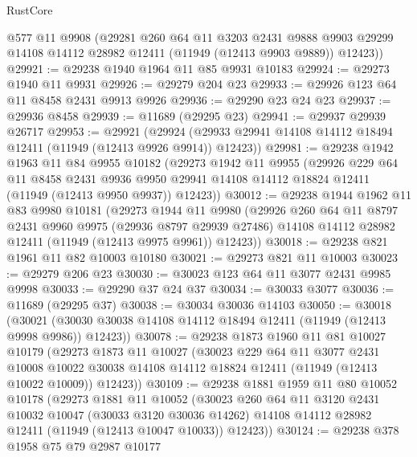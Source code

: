 \begin{lexlean}{RustCore}
\begin{coremodule}
      @577
      @11
      @9908
      (@29281
        @260
        @64
        @11
        @3203
        @2431
        @9888
        @9903
        @29299
        @14108
        @14112
        @28982
        @12411
        (@11949 (@12413 @9903 @9889))
        @12423))
@29921 := @29238 @1940 @1964 @11 @85 @9931 @10183
@29924 := @29273 @1940 @11 @9931
@29926 := @29279 @204 @23
@29933 := @29926 @123 @64 @11 @8458 @2431 @9913 @9926
@29936 := @29290 @23 @24 @23
@29937 := @29936 @8458
@29939 := @11689 (@29295 @23)
@29941 := @29937 @29939 @26717
@29953 := @29921
    (@29924 (@29933 @29941 @14108 @14112 @18494 @12411 (@11949 (@12413 @9926 @9914)) @12423))
@29981 := @29238
    @1942
    @1963
    @11
    @84
    @9955
    @10182
    (@29273
      @1942
      @11
      @9955
      (@29926
        @229
        @64
        @11
        @8458
        @2431
        @9936
        @9950
        @29941
        @14108
        @14112
        @18824
        @12411
        (@11949 (@12413 @9950 @9937))
        @12423))
@30012 := @29238
    @1944
    @1962
    @11
    @83
    @9980
    @10181
    (@29273
      @1944
      @11
      @9980
      (@29926
        @260
        @64
        @11
        @8797
        @2431
        @9960
        @9975
        (@29936 @8797 @29939 @27486)
        @14108
        @14112
        @28982
        @12411
        (@11949 (@12413 @9975 @9961))
        @12423))
@30018 := @29238 @821 @1961 @11 @82 @10003 @10180
@30021 := @29273 @821 @11 @10003
@30023 := @29279 @206 @23
@30030 := @30023 @123 @64 @11 @3077 @2431 @9985 @9998
@30033 := @29290 @37 @24 @37
@30034 := @30033 @3077
@30036 := @11689 (@29295 @37)
@30038 := @30034 @30036 @14103
@30050 := @30018
    (@30021 (@30030 @30038 @14108 @14112 @18494 @12411 (@11949 (@12413 @9998 @9986)) @12423))
@30078 := @29238
    @1873
    @1960
    @11
    @81
    @10027
    @10179
    (@29273
      @1873
      @11
      @10027
      (@30023
        @229
        @64
        @11
        @3077
        @2431
        @10008
        @10022
        @30038
        @14108
        @14112
        @18824
        @12411
        (@11949 (@12413 @10022 @10009))
        @12423))
@30109 := @29238
    @1881
    @1959
    @11
    @80
    @10052
    @10178
    (@29273
      @1881
      @11
      @10052
      (@30023
        @260
        @64
        @11
        @3120
        @2431
        @10032
        @10047
        (@30033 @3120 @30036 @14262)
        @14108
        @14112
        @28982
        @12411
        (@11949 (@12413 @10047 @10033))
        @12423))
@30124 := @29238
    @378
    @1958
    @75
    @79
    @2987
    @10177

\end{coremodule}
\end{lexlean}
